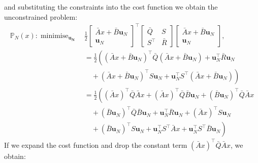 \documentclass[a4paper,11pt,reqno]{amsart}
\newcommand{\tran}{\intercal}
\DeclareMathOperator*{\minimise}{minimise}
\begin{document}
and substituting the constraints into the cost function we obtain the unconstrained problem:
\begin{subequations}
    \begin{align}
        \mathbb{P}_N(x): \minimise_{\bm{u_N}} \,
        & \tfrac{1}{2}
        \begin{bmatrix}
            \bar{A} x + \bar{B}\bm{u}_N\\
            \bm{u}_N
        \end{bmatrix}^{\tran}
        \begin{bmatrix}
            \bar{Q}&S\\
            S^{\tran}&\bar{R}
        \end{bmatrix}
        \begin{bmatrix}
            \bar{A} x + \bar{B}\bm{u}_N\\
            \bm{u}_N
        \end{bmatrix},
        \\
        &=\tfrac{1}{2}\left((\bar{A}x + \bar{B}\bm{u}_N)^{\tran}\bar{Q}(\bar{A} x + \bar{B}\bm{u}_N)+\bm{u}_N^{\tran}\bar{R}\bm{u}_N\right.
        \\
        &\left.\quad+(\bar{A}x + \bar{B}\bm{u}_N)^{\tran}S\bm{u}_N+\bm{u}_N^{\tran}S^{\tran}(\bar{A} x + \bar{B}\bm{u}_N)\right) 
        \\
        &=\tfrac{1}{2}\left((\bar{A}x)^{\tran}\bar{Q}\bar{A}x+(\bar{A}x)^{\tran}\bar{Q}\bar{B}\bm{u}_N+(\bar{B}\bm{u}_N)^{\tran}\bar{Q}\bar{A}x\right.
        \\
        &\quad+(\bar{B}\bm{u}_N)^{\tran}\bar{Q}\bar{B}\bm{u}_N+\bm{u}_N^{\tran}\bar{R}\bm{u}_N+(\bar{A}x)^{\tran}S\bm{u}_N
        \\
        &\left.\quad+(\bar{B}\bm{u}_N)^{\tran}S\bm{u}_N+\bm{u}_N^{\tran}S^{\tran}\bar{A}x+\bm{u}_N^{\tran}S^{\tran}\bar{B}\bm{u}_N\right) 
    \end{align}
\end{subequations}
If we expand the cost function and drop the constant term $(\bar{A}x)^{\tran}\bar{Q}\bar{A}x$, we obtain:
\end{document}
